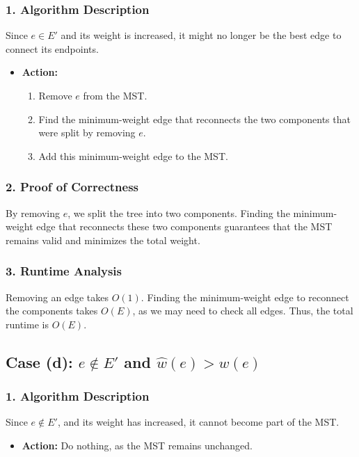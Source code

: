 \documentclass[11pt]{article}
\begin{document}
\subsubsection*{1. Algorithm Description}
Since \( e \in E' \) and its weight is increased, it might no longer be the best edge to connect its endpoints.
\begin{itemize}
    \item \textbf{Action:}
    \begin{enumerate}
        \item Remove \( e \) from the MST.
        \item Find the minimum-weight edge that reconnects the two components that were split by removing \( e \).
        \item Add this minimum-weight edge to the MST.
    \end{enumerate}
\end{itemize}

\subsubsection*{2. Proof of Correctness}
By removing \( e \), we split the tree into two components. Finding the minimum-weight edge that reconnects these two components guarantees that the MST remains valid and minimizes the total weight.

\subsubsection*{3. Runtime Analysis}
Removing an edge takes \( O(1) \). Finding the minimum-weight edge to reconnect the components takes \( O(E) \), as we may need to check all edges. Thus, the total runtime is \( O(E) \).

\subsection*{Case (d): \( e \notin E' \) and \( \hat{w}(e) > w(e) \)}

\subsubsection*{1. Algorithm Description}
Since \( e \notin E' \), and its weight has increased, it cannot become part of the MST.
\begin{itemize}
    \item \textbf{Action:} Do nothing, as the MST remains unchanged.
\end{itemize}
\end{document}

